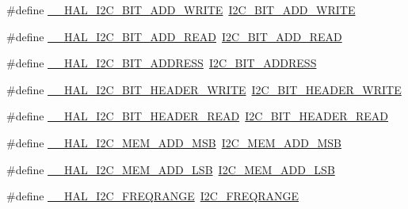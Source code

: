 \begin{DoxyCompactItemize}
\item 
\#define \hyperlink{group___h_a_l___i2_c___aliased___macros_gaedfa90bb490b4ad07c6f0d7e0255f70a}{\+\_\+\+\_\+\+H\+A\+L\+\_\+\+I2\+C\+\_\+B\+I\+T\+\_\+\+A\+D\+D\+\_\+\+W\+R\+I\+TE}~\hyperlink{group___i2_c___private___macros_gad83949bd18eca67258b05763a90d0128}{I2\+C\+\_\+B\+I\+T\+\_\+\+A\+D\+D\+\_\+\+W\+R\+I\+TE}
\item 
\#define \hyperlink{group___h_a_l___i2_c___aliased___macros_gade14fc1431c1ff134f519b7affce1d67}{\+\_\+\+\_\+\+H\+A\+L\+\_\+\+I2\+C\+\_\+B\+I\+T\+\_\+\+A\+D\+D\+\_\+\+R\+E\+AD}~\hyperlink{group___i2_c___private___macros_gacec6f0d6fde48a24327d2db15387fed8}{I2\+C\+\_\+B\+I\+T\+\_\+\+A\+D\+D\+\_\+\+R\+E\+AD}
\item 
\#define \hyperlink{group___h_a_l___i2_c___aliased___macros_gada8050e1518bf7e92dc2f4dbf7a03ad2}{\+\_\+\+\_\+\+H\+A\+L\+\_\+\+I2\+C\+\_\+B\+I\+T\+\_\+\+A\+D\+D\+R\+E\+SS}~\hyperlink{group___i2_c___private___macros_ga51ad2b93ef13577d3d437507e09191cd}{I2\+C\+\_\+B\+I\+T\+\_\+\+A\+D\+D\+R\+E\+SS}
\item 
\#define \hyperlink{group___h_a_l___i2_c___aliased___macros_gac10ed08f8e6a57a8cac00fce7fe3fb00}{\+\_\+\+\_\+\+H\+A\+L\+\_\+\+I2\+C\+\_\+B\+I\+T\+\_\+\+H\+E\+A\+D\+E\+R\+\_\+\+W\+R\+I\+TE}~\hyperlink{group___i2_c___private___macros_ga0edd591eaa2ce5511148bf1ebf533e1a}{I2\+C\+\_\+B\+I\+T\+\_\+\+H\+E\+A\+D\+E\+R\+\_\+\+W\+R\+I\+TE}
\item 
\#define \hyperlink{group___h_a_l___i2_c___aliased___macros_ga64663fb18b88675c915c2c79d11cd38f}{\+\_\+\+\_\+\+H\+A\+L\+\_\+\+I2\+C\+\_\+B\+I\+T\+\_\+\+H\+E\+A\+D\+E\+R\+\_\+\+R\+E\+AD}~\hyperlink{group___i2_c___private___macros_ga8d833802aafa40a959f62965e498108c}{I2\+C\+\_\+B\+I\+T\+\_\+\+H\+E\+A\+D\+E\+R\+\_\+\+R\+E\+AD}
\item 
\#define \hyperlink{group___h_a_l___i2_c___aliased___macros_gac49e0a8165df628a4692ff73a92ae444}{\+\_\+\+\_\+\+H\+A\+L\+\_\+\+I2\+C\+\_\+\+M\+E\+M\+\_\+\+A\+D\+D\+\_\+\+M\+SB}~\hyperlink{group___i2_c___private___macros_ga2e42fa55be22240dc5a54a0304d01cfb}{I2\+C\+\_\+\+M\+E\+M\+\_\+\+A\+D\+D\+\_\+\+M\+SB}
\item 
\#define \hyperlink{group___h_a_l___i2_c___aliased___macros_ga52194913b0724379d50176a38d64ac2a}{\+\_\+\+\_\+\+H\+A\+L\+\_\+\+I2\+C\+\_\+\+M\+E\+M\+\_\+\+A\+D\+D\+\_\+\+L\+SB}~\hyperlink{group___i2_c___private___macros_ga9c8f1a763307d0c37bb4e2dcfdf3bb9f}{I2\+C\+\_\+\+M\+E\+M\+\_\+\+A\+D\+D\+\_\+\+L\+SB}
\item 
\#define \hyperlink{group___h_a_l___i2_c___aliased___macros_gab6eef1876c1418c050cb724dc1f3a3bc}{\+\_\+\+\_\+\+H\+A\+L\+\_\+\+I2\+C\+\_\+\+F\+R\+E\+Q\+R\+A\+N\+GE}~\hyperlink{group___i2_c___private___macros_ga9b4e4686872c7b0bd9daed9049d0c431}{I2\+C\+\_\+\+F\+R\+E\+Q\+R\+A\+N\+GE}
\end{DoxyCompactItemize}


